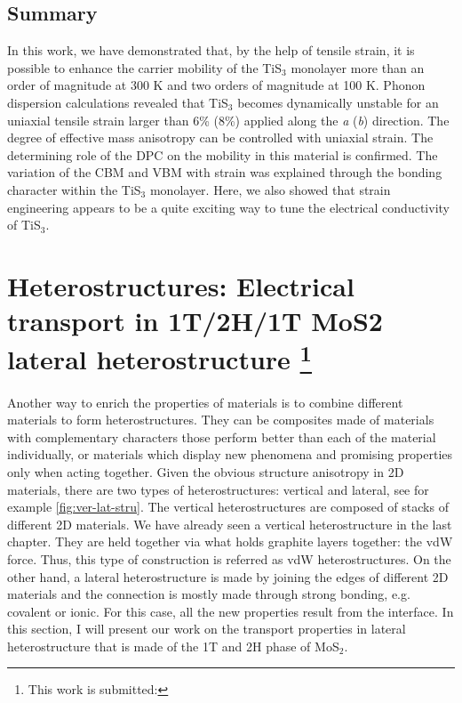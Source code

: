 \subsection{Summary}

In this work, we have demonstrated that, by the help of tensile strain, it is possible to enhance the carrier mobility of the TiS$_3$ monolayer more than an order of magnitude at 300 K and two orders of magnitude at 100 K. Phonon dispersion calculations revealed that TiS$_3$ becomes dynamically unstable for an uniaxial tensile strain larger than 6\% (8\%) applied along the \textit{a} (\textit{b}) direction. The degree of effective mass anisotropy can be controlled with uniaxial strain. The determining role of the DPC on the mobility in this material is confirmed. The variation of the CBM and VBM with strain was explained through the bonding character within the TiS$_3$ monolayer.  Here, we also showed that strain engineering appears to be a quite exciting way to tune the electrical conductivity of TiS$_3$.

\section[Heterostructures: Electrical transport in 1T/2H/1T MoS2 lateral heterostructure]{Heterostructures: Electrical transport in 1T/2H/1T MoS2 lateral heterostructure \footnote{This work is submitted:\cite{Aierken2017.transport}} \label{trans_mx2}}

Another way to enrich the properties of materials is to combine different materials to form heterostructures\cite{Geim_Grigorieva_2013,Liu2016b,Pomerantseva2017}. They can be composites made of materials with complementary characters those perform better than each of the material individually, or materials which display new phenomena and promising properties only when acting together.  Given the obvious structure anisotropy in 2D materials, there are two types of heterostructures: vertical and lateral\cite{Allain2015}, see for example \autoref{fig:ver-lat-stru}. The vertical heterostructures are composed of stacks of different 2D materials. We have already seen a vertical heterostructure in the last chapter. They are held together via what holds graphite layers together: the vdW force. Thus, this type of construction is referred as vdW heterostructures.  On the other hand, a lateral heterostructure\cite{Jena2014,Chhowalla2015} is made by joining the edges of different 2D materials and the connection is mostly made through strong bonding, e.g. covalent or ionic. For this case, all the new properties result from the interface. In this section, I will present our work on the transport properties in lateral heterostructure that is made of the 1T and 2H phase of MoS$_2$. 

